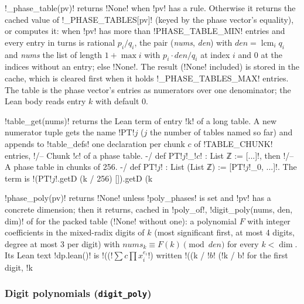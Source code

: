 {\begin{definition}\label{def:lean-export-net-packed}
\py!_phase_table(pv)! returns \py!None! when \py!pv! has a rule. Otherwise it returns the cached
value of \py!_PHASE_TABLES[pv]! (keyed by the phase vector's equality), or computes it: when
\py!pv! has more than \py!PHASE_TABLE_MIN! entries and every entry in turns is rational $p_i/q_i$,
the pair (\textit{nums}, \textit{den}) with $\textit{den} = \operatorname{lcm}_i q_i$ and
\textit{nums} the list of length $1 + \max i$ with $p_i\cdot\textit{den}/q_i$ at index $i$ and 0
at the indices without an entry; else \py!None!. The result (\py!None! included) is stored in
the cache, which is cleared first when it holds \py!_PHASE_TABLES_MAX! entries. The table is the
phase vector's entries as numerators over one denominator; the Lean body reads entry $k$ with
default 0.

\py!table_get(nums)! returns the Lean term of entry \code!k! of a long table. A new numerator
tuple gets the name \code!PT!$j$ ($j$ the number of tables named so far) and appends to
\py!table_defs! one declaration per chunk $c$ of \py!TABLE_CHUNK! entries,
\code!/-- Chunk !$c$\code! of a phase table. -/ def PT!$j$\code!_!$c$\leanx! : List ℤ := [...]!,
then \code!/-- A phase table in chunks of 256. -/ def PT!$j$\leanx! : List (List ℤ) := [PT!$j$\code!_0, ...]!.
The term is \code!(PT!$j$\code!.getD (k / 256) []).getD (k %

\py!phase_poly(pv)! returns \py!None! unless \py!poly_phases! is set and \py!pv! has a concrete
dimension; then it returns, cached in \py!poly_of!, \py!digit_poly(nums, den, dim)! of
 for the packed table (\py!None! without one): a
polynomial $F$ with integer coefficients in the mixed-radix digits of $k$ (most significant
first, at most 4 digits, degree at most 3 per digit) with
$\textit{nums}_k \equiv F(k) \pmod{\textit{den}}$ for every $k < \dim$. Its Lean text
\py!dp.lean()! is \code!((!$\sum c\prod x_i^{e_i}$\code!) %
written \code!((k / !$b$\code! %
(\code!k / b! for the first digit, \code!k %
\end{definition}

\subsubsection{Digit polynomials (\texttt{digit\_poly})}\label{sec:lean-export-net-digitpoly}

}
